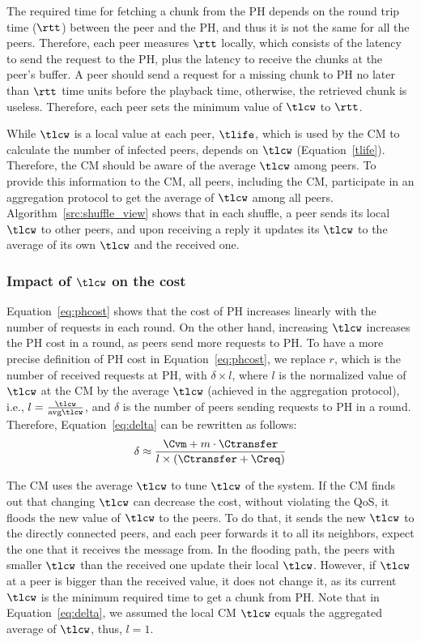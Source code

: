 The required time for fetching a chunk from the PH depends on the round trip
time ($\rtt$) between the peer and the PH, and thus it is not the same for all the
peers. Therefore, each peer measures $\rtt$ locally, which consists of the
latency to send the request to the PH, plus the latency to receive the chunks at
the peer's buffer. A peer should send a request for a missing chunk to PH no
later than $\rtt$ time units before the playback time, otherwise, the retrieved chunk is
useless. Therefore, each peer sets the minimum value of $\tlcw$ to $\rtt$.

While $\tlcw$ is a local value at each peer, $\tlife$, which is used by the CM to
calculate the number of infected peers, depends on $\tlcw$
(Equation~\ref{tlife}). Therefore, the CM should be aware of the average $\tlcw$
among peers. To provide this information to the CM, all peers, including the CM,
participate in an aggregation protocol to get the average of $\tlcw$ among all
peers. Algorithm~\ref{src:shuffle_view} shows that in each shuffle, a peer
sends its local $\tlcw$ to other peers, and upon receiving a reply it updates
its $\tlcw$ to the average of its own $\tlcw$ and the received one.

\subsubsection{Impact of $\tlcw$ on the cost} 

Equation~\ref{eq:phcost} shows that the cost of PH increases linearly with
the  number of requests in each round. On the other hand, increasing
$\tlcw$ increases the PH cost in a round, as peers send more requests to PH.
To have a more precise definition of PH cost in Equation~\ref{eq:phcost}, we
replace $r$, which is the number of received requests at PH, with $\delta
\times l$, where $l$ is the normalized value of $\tlcw$ at the CM by the average
$\tlcw$ (achieved in the aggregation protocol), i.e., $l =
\frac{\tlcw}{\textrm{avg}\tlcw}$, and $\delta$ is the number of peers sending
requests to PH in a round. Therefore, Equation~\ref{eq:delta} can be rewritten
as follows:
\begin{equation}\label{eq:newdelta}
\delta \approx \frac{\Cvm + m \cdot \Ctransfer}{l \times (\Ctransfer + \Creq)}
\end{equation}

The CM uses the average $\tlcw$ to tune $\tlcw$ of the system. If the CM finds out
that changing $\tlcw$ can decrease the cost, without violating the QoS, it
floods the new value of $\tlcw$ to the peers. To do that, it sends the new
$\tlcw$ to the directly connected peers, and each peer forwards it to all its
neighbors, expect the one that it receives the message from. In the flooding
path, the peers with smaller $\tlcw$ than the received one update their local
$\tlcw$. However, if $\tlcw$ at a peer is bigger than the received value, it
does not change it, as its current $\tlcw$ is the minimum required time to get
a chunk from PH. Note that in Equation~\ref{eq:delta}, we assumed the local CM
$\tlcw$ equals the aggregated average of $\tlcw$, thus, $l=1$.

